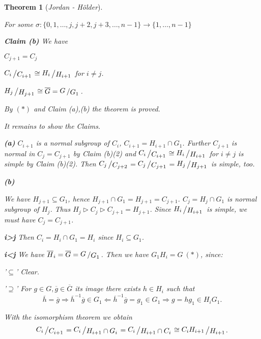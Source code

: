 \documentclass[11pt]{book}
\newtheorem{theorem}{Theorem}[section]
\theoremstyle{nonumberbreak}
\newenvironment{pr}[1][]{\ifthenelse{\equal{#1}{}}{\proof}{\proof[#1]}\rm}{\endproof}
\newcommand{\slant}[2]{{\raisebox{.1em}{$#1$}\left/\raisebox{-.1em}{$#2$}\right.}}
\begin{document}
\begin{spacing}{1.3}
\begin{theorem}[\rm \it Jordan - Hölder]
\begin{pr}
\begin{compactitem}
For some $\sigma: \{0,1, \ldots, j,j+2,j+3, \ldots, n-1\} \longrightarrow \{1, \ldots, n-1\}$
\begin{compactenum}
\item[\textbf{Claim (b)}] We have
\begin{compactenum}
\item $C_{j+1}=C_j$
\item $\slant{C_i}{C_{i+1}} \cong \slant{H_i}{H_{i+1}}$ for $i \neq j$.
\item $\slant{H_j}{H_{j+1}} \cong \overline{G} = \slant{G}{G_1}$.
\end{compactenum}
\end{compactenum}
By $(*)$ and Claim (a),(b) the theorem is proved.
\end{compactitem}
It remains to show the Claims.
\begin{compactenum}
\item[\textbf{(a)}] $C_{i+1}$ is a normal subgroup of $C_i$, $C_{i+1}=H_{i+1} \cap G_1$. Further
$C_{j+1}$ is normal in $C_j=C_{j+1}$ by Claim (b)(2) and
$\slant{C_{i}}{C_{i+1}} \cong \slant{H_i}{H_{i+1}}$ for $i \neq j$ is simple by Claim (b)(2). Then
$\slant{C_j}{C_{j+2}} = \slant{C_j}{C_{j+1}} = \slant{H_j}{H_{j+1}}$ is simple, too.
\item[\textbf{(b)}] \begin{compactenum}
\item We have $H_{j+1} \subseteq G_1$, hence $H_{j+1}\cap G_1=H_{j+1}=C_{j+1}$. $C_j=H_j \cap G_1$ is normal subgroup of $H_j$.
Thus $H_j \triangleright C_j \triangleright C_{j+1}=H_{j+1}$. Since $\slant{H_i}{H_{i+1}}$ is simple, we must have $C_j=C_{j+1}$.
\item \begin{compactenum}
\item[\bf{i>j}] Then $C_i=H_i \cap G_1=H_i$ since $H_i \subseteq G_1$.
\item[\bf{i<j}] We have $\overline{H}_i=\overline{G}=\slant{G}{G_1}$.
Then we have $G_1 H_i=G \ (*)$, since:
\begin{compactitem}
\item['$\subseteq$'] Clear.
\item['$\supseteq$'] For $g \in G, \overline{g} \in \overline{G}$ its image there exists $h \in H_i$ such that
$$ \overline{h}=\overline{g} \Longrightarrow \overline{h}^{-1}\overline{g} \in G_1 \Longleftarrow \overline{h}^{-1}\overline{g}=g_1 \in G_1 \Longrightarrow g=hg_1 \in H_i G_1.$$
\end{compactitem}
With the isomorphism theorem we obtain 
$$\slant{C_i}{C_{i+1}} = \slant{C_i}{H_{i+1} \cap G_i} = \slant{C_i}{H_{i+1}\cap C_i} \cong \slant{C_i H_{i+1}}{H_{i+1}}.$$

\end{compactenum}
\end{compactenum}
\end{compactenum}
\end{pr}
\end{theorem}
\end{spacing}
\end{document}
